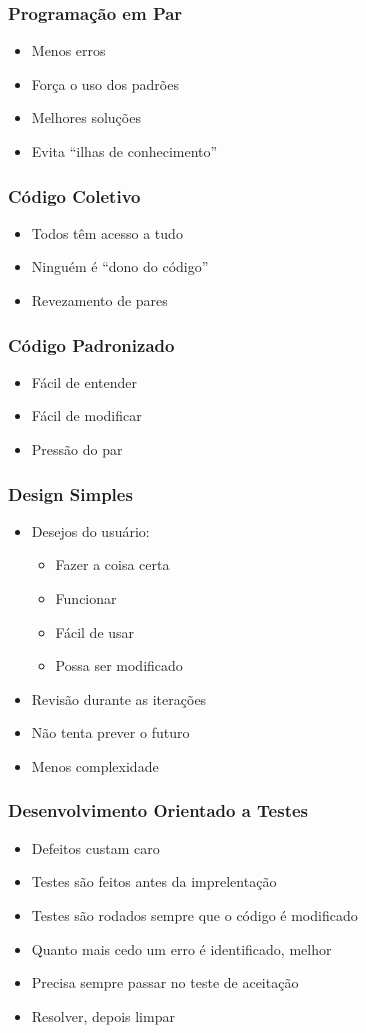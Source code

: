 \documentclass[10pt]{beamer}
\begin{document}
\begin{frame}
  \frametitle{Programação em Par}
  \begin{itemize}
  \item Menos erros
  \item Força o uso dos padrões
  \item Melhores soluções
  \item Evita ``ilhas de conhecimento''
  \end{itemize}
\end{frame}

\begin{frame}
  \frametitle{Código Coletivo}
  \begin{itemize}
  \item Todos têm acesso a tudo
  \item Ninguém é ``dono do código''
  \item Revezamento de pares
  \end{itemize}
\end{frame}

\begin{frame}
  \frametitle{Código Padronizado}
  \begin{itemize}
  \item Fácil de entender
  \item Fácil de modificar
  \item Pressão do par
  \end{itemize}
\end{frame}

\begin{frame}
  \frametitle{Design Simples}
  \begin{itemize}
  \item Desejos do usuário:
  \begin{itemize}
    \item Fazer a coisa certa
    \item Funcionar
    \item Fácil de usar
    \item Possa ser modificado
  \end{itemize}
  \item Revisão durante as iterações
  \item Não tenta prever o futuro
  \item Menos complexidade
  \end{itemize}
\end{frame}

\begin{frame}
  \frametitle{Desenvolvimento Orientado a Testes}
  \begin{itemize}
  \item Defeitos custam caro
  \item Testes são feitos antes da imprelentação
  \item Testes são rodados sempre que o código é modificado
  \item Quanto mais cedo um erro é identificado, melhor
  \item Precisa sempre passar no teste de aceitação
  \item Resolver, depois limpar
  \end{itemize}
\end{frame}
\end{document}
